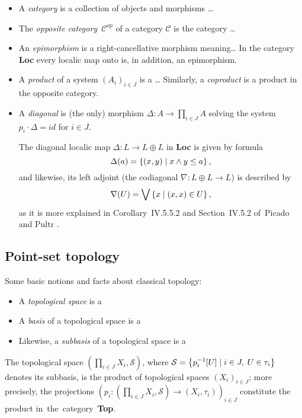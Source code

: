 \begin{itemize}
\item A \emph{category} is a collection of objects and morphisms \ldots
\item The \emph{opposite category}~$\mathcal{C}^{op}$ of a category
$\mathcal{C}$ is the category \ldots
\item An \emph{epimorphism} is a right-cancellative morphism meaning\ldots
In the category {\bf Loc} every localic map onto is, in addition, an
epimorphism.
\item A \emph{product} of a system $\left(A_i\right)_{i\in J}$ is a \ldots
Similarly, a \emph{coproduct} is a product in the opposite category.
\item A \emph{diagonal} is (the only) morphism $\Delta\colon A \to \prod_{i\in
J} A$ solving the system $p_i\cdot \Delta = id$ for $i \in J$.
  \begin{exmpl} \label{(co)diag-in-Loc}
    The diagonal localic map $\Delta\colon L \to L \oplus L$ in {\bf Loc} is
    given by formula
    \[
      \Delta(a) = \left\{ (x, y) \mid x \wedge y \leq a \right\},
    \]
    and likewise, its left adjoint (the codiagonal $\nabla\colon L \oplus L \to
    L$) is described by
    \[
      \nabla(U) = \bigvee \left\{ x \mid (x, x)\in U \right\},
    \]
    as it is more explained in Corollary~IV.5.5.2 and Section~IV.5.2 of~Picado
    and Pultr \cite{picado-pultr12}.
  \end{exmpl}
\end{itemize}


\subsection*{Point-set topology}

Some basic notions and facts about classical topology:

\begin{itemize}
\item A \emph{topological space} is a
\item A \emph{basis} of a topological space is a
\item Likewise, a \emph{subbasis} of a topological space is a
\end{itemize}

\begin{fact}
  The topological space $\left( \prod_{i\in J} X_i, \mathcal{S} \right)$, where
  $\mathcal{S} = \left\{ p_{i}^{-1}[U] \mid i\in J, \; U\in \tau_i \right\}$
  denotes its subbasis, is the product of topological spaces $\left( X_i
  \right)_{i\in J}$;
  more precisely, the projections $\left( p_i\colon \left(\prod_{i\in J} X_i,
  \mathcal{S}\right) \to \left(X_i, \tau_i\right) \right)_{i\in J}$
  constitute the product in~the~category~{\bf Top}.
\end{fact}

